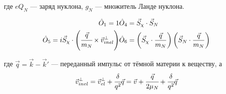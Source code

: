 где $e Q_N$ --- заряд нуклона,  $g_N$ --- множитель Ланде нуклона.


\begin{eqnarray}
	\hat{O}_1 = 1 & 
	\hat{O}_4 = \vec{S}_{\chi}\cdot\vec{S}_{N} \\
	\hat{O}_5 = i\vec{S}_{\chi}\cdot \left(\cfrac{\vec{q}}{m_N} \times \vec{v}^{\perp}_{inel} \right) & 
	\hat{O}_6 = \left(\vec{S}_{\chi} \cdot \frac{\vec{q}}{m_N}\right)\left(\vec{S}_N \cdot \frac{\vec{q}}{m_N}\right)
\end{eqnarray}

где $\vec{q} = \vec{k} - \vec{k}'$ --- переданный импульс от тёмной материи к веществу, а 
\begin{equation}
	\vec{v}^{\perp}_{inel} = \vec{v}^{\perp}_{el} + \cfrac{\delta}{q^2} \vec{q} = \vec{v}+\cfrac{\vec{q}}{2\mu_{N}} + \cfrac{\delta}{q^2} \vec{q}
\end{equation}
